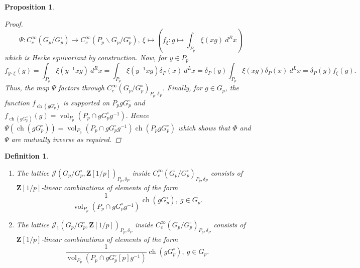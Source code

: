 \documentclass{amsart}%
\theoremstyle{plain}
\newtheorem{prop}[thm]{Proposition}
\theoremstyle{plain}
\newtheorem{defn}[thm]{Definition}
\theoremstyle{remark}
\DeclareMathOperator{\ch}{ch}
\DeclareMathOperator{\vol}{vol}
\begin{document}
\begin{prop}
\begin{proof}
        $$\Psi: C_c^\infty(G_p/G_p^\circ)\longrightarrow C_c^\infty(P_p\backslash G_p/G_p^\circ),\ \xi\mapsto \left(f_\xi:g\mapsto \int_{P_p}\xi(xg)\ d^Rx\right)$$
        which is Hecke equivariant by construction. Now, for $y\in P_p$ $$f_{y\cdot\xi}(g)=\int_{P_p}\xi(y^{-1}xg)\ d^Rx=\int_{P_p}\xi(y^{-1}xg)\delta_P(x)\ d^Lx=\delta_P(y)\int_{P_p}\xi(xg)\delta_P(x)\ d^Lx=\delta_P(y)f_\xi(g).$$
        Thus, the map $\Psi$ factors through $C_c^\infty(G_p/G_p^\circ)_{P_p,\delta_P}$. Finally, for $g\in G_p$, the function $f_{\ch(gG_p^\circ)}$ is supported on $P_pg G_p^\circ$ and 
        $f_{\ch(gG_p^\circ)}(g)=\vol_{P_p}\left(P_p\cap g G_p^\circ g^{-1}\right).$ Hence $\Psi(\ch(gG_p^\circ))=\vol_{P_p}\left(P_p\cap g G_p^\circ g^{-1}\right)\ch(P_pgG_p^\circ)$ which shows that $\Phi$ and $\Psi$ are mutually inverse as required.
    \end{proof}
\end{prop}

\begin{defn}
    \begin{enumerate}    
\item The lattice $\mathcal{J}(G_p/G_p^\circ,\mathbf{Z}[1/p])_{P_p,\delta_P}$ inside $C_c^\infty(G_p/G_p^\circ)_{P_p,\delta_P}$ consists of $\mathbf{Z}[1/p]$-linear combinations of elements of the form
    $$\frac{1}{\vol_{P_p}\left(P_p\cap g G_p^\circ g^{-1}\right)}\ch(g G_p^\circ),\ g\in G_p.$$
    \item The lattice $\mathcal{J}_1(G_p/G_p^\circ,\mathbf{Z}[1/p])_{P_p,\delta_P}$ inside $C_c^\infty(G_p/G_p^\circ)_{P_p,\delta_P}$ consists of $\mathbf{Z}[1/p]$-linear combinations of elements of the form 
    $$\frac{1}{\vol_{P_p}\left(P_p\cap gG_p^\circ[p] g^{-1}\right)}\ch(gG_p^\circ),\ g\in G_p.$$
\end{enumerate}
\end{defn}
\end{document}
